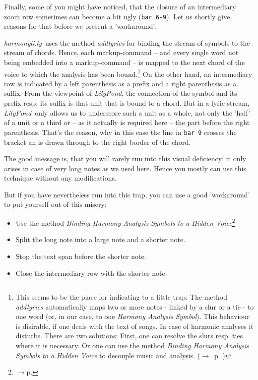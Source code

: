 \documentclass[
  DIV=calc,
  BCOR=5mm,
  12pt,
  headings=small,
  oneside,
  abstract=true,
  toc=bib,
  xcolor=dvipsnames,
  openany,
  ngerman,english]{scrartcl}
\newcommand{\acc}[0]{\textit}
\newcommand{\ra}[0]{$\rightarrow$}
\newcommand{\hlyn}[0]{\textit{harmonyli.ly}}
\newcommand{\lily}[0]{\textit{LilyPond}}
\newcommand{\has}[1]{\textit{Harmony Analysis Symbol#1}}
\begin{document}
Finally, some of you might have noticed, that the closure of an intermediary
zoom row sometimes can become a bit ugly (\texttt{bar 6-9}). Let us shortly
give reasons for that before we present a 'workaround':

\hlyn\ uses the method \acc{addlyrics} for binding the stream of symbols to the
stream of chords. Hence, each markup-command -- and every single word not being
embedded into a markup-command -- is mapped to the next chord of the voice to
which the analysis has been bound.\footnote{This seems to be the place for
indicating to a little trap: The method \acc{addlyrics} automatically maps two
or more notes - linked by a slur or a tie - to one word (or, in our case, to one
\has{}). This behaviour is disirable, if one deals with the text of songs. In
case of harmonic analyses it disturbs. There are two solutions: First, one can
resolve the slurs resp. ties where it is necessary. Or one can use the method
\acc{Binding \has{s} to a Hidden Voice} to decouple music and analysis. (\ra \
p. \pageref{HiddenVoice})} On the other hand, an intermediary row is indicated
by a left parenthesis as a prefix and a right parenthesis as a suffix.
From the viewpoint of \lily, the connection of the symbol and its prefix resp.
its suffix is that unit that is bound to a chord. But in a lyric stream, \lily\
only allows us to underscore such a unit as a whole, not only the 'half' of a
unit or a third or -- as it actually is required here -- the part before the
right parenthesis. That's the reason, why in this case the line in \texttt{bar
9} crosses the bracket an is drawn through to the right border of the chord.

The good message is, that you will rarely run into this visual deficiency:
it only arises in case of very long notes as we used here. Hence you mostly can
use this technique without any modifications. 

But if you have nevertheless run into this trap, you can use a good
'workaround' to put yourself out of this misery:

\begin{itemize}
  \item Use the method \acc{Binding \has{s} to a Hidden Voice}\footnote{\ra p.
  \pageref{HiddenVoice}}
  \item Split the long note into a large note and a shorter note.
  \item Stop the text span before the shorter note.
  \item Close the intermediary row with the shorter note.
\end{itemize}
\end{document}
